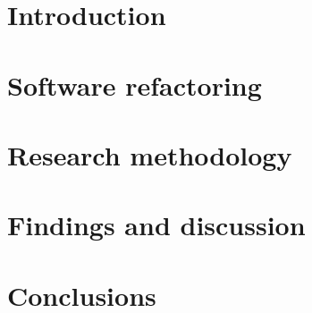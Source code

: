 \documentclass[english,12pt,a4paper,pdftex,sci,utf8]{aaltothesis}
\begin{document}

\renewcommand{\arraystretch}{1.5} 

\section{Introduction} \label{introduction}

\clearpage

\section{Software refactoring} \label{literature}

\clearpage

\section{Research methodology} \label{research setting}

\clearpage

\section{Findings and discussion} \label{case study}

\clearpage

%

\section{Conclusions} \label{conclusions}

\clearpage
\end{document}
